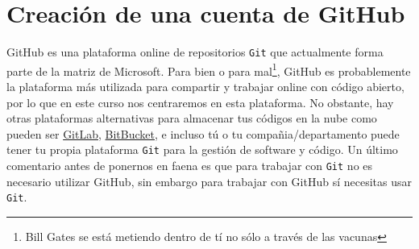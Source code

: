 \documentclass[a4paper,10pt]{report}
\begin{document}
  \section{Creación de una cuenta de GitHub}
    GitHub es una plataforma online de repositorios \verb+Git+ que actualmente forma parte de la matriz de Microsoft. Para bien o para mal\footnote{Bill Gates se está metiendo dentro de tí no sólo a través de las vacunas}, GitHub es probablemente la plataforma más utilizada para compartir y trabajar online con código abierto, por lo que en este curso nos centraremos en esta plataforma. No obstante, hay otras plataformas alternativas para almacenar tus códigos en la nube como pueden ser \href{https://about.gitlab.com}{GitLab}, \href{https://bitbucket.org}{BitBucket}, e incluso tú o tu compañia/departamento puede tener tu propia plataforma \verb+Git+ para la gestión de software y código. Un último comentario antes de ponernos en faena es que para trabajar con \verb+Git+ no es necesario utilizar GitHub, sin embargo para trabajar con GitHub sí necesitas usar \verb+Git+. 
  

   
   

 
\end{document}
